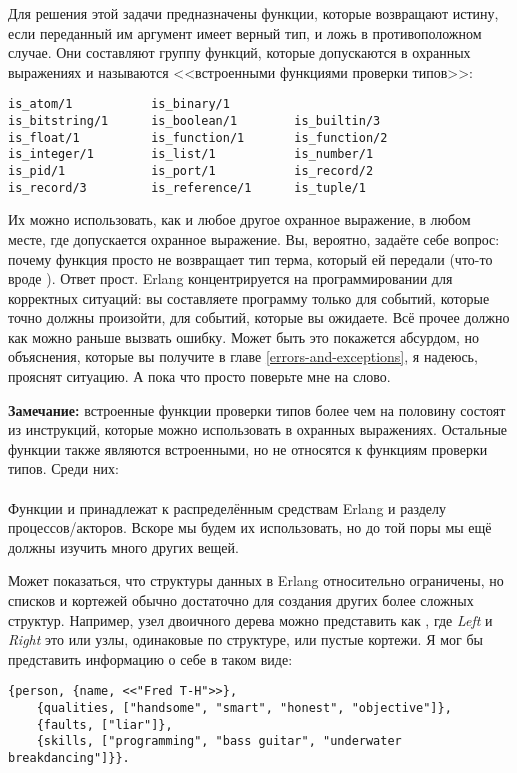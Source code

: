 Для решения этой задачи предназначены функции, которые возвращают истину, если переданный им аргумент имеет верный тип, и ложь в противоположном случае.
Они составляют группу функций, которые допускаются в охранных выражениях и называются <<встроенными функциями проверки типов>>:
\begin{lstlisting}[style=erlang]
is_atom/1           is_binary/1        
is_bitstring/1      is_boolean/1        is_builtin/3       
is_float/1          is_function/1       is_function/2      
is_integer/1        is_list/1           is_number/1        
is_pid/1            is_port/1           is_record/2        
is_record/3         is_reference/1      is_tuple/1        
\end{lstlisting}

Их можно использовать, как и любое другое охранное выражение, в любом месте, где допускается охранное выражение.
Вы, вероятно, задаёте себе вопрос: почему функция просто не возвращает тип терма, который ей передали (что\--то вроде ).
Ответ прост.
Erlang концентрируется на программировании для корректных ситуаций: вы составляете программу только для событий, которые точно должны произойти, для событий, которые вы ожидаете.
Всё прочее должно как можно раньше вызвать ошибку.
Может быть это покажется абсурдом, но объяснения, которые вы получите в главе \ref{errors-and-exceptions}, я надеюсь, прояснят ситуацию.
А пока что просто поверьте мне на слово.\\
\colorbox{lgray}
{
    \begin{minipage}{\linewidth}
\textbf{Замечание:} встроенные функции проверки типов более чем на половину состоят из инструкций, которые можно использовать в охранных выражениях.
Остальные функции также являются встроенными, но не относятся к функциям проверки типов.
Среди них:\\
\\
Функции  и  принадлежат к распределённым средствам Erlang и разделу процессов/акторов.
Вскоре мы будем их использовать, но до той поры мы ещё должны изучить много других вещей.
    \end{minipage}
}

Может показаться, что структуры данных в Erlang относительно ограничены, но списков и кортежей обычно достаточно для создания других более сложных структур.
Например, узел двоичного дерева можно представить как , где \emph{Left} и \emph{Right} это или узлы, одинаковые по структуре, или пустые кортежи.
Я мог бы представить информацию о себе в таком виде:
\begin{lstlisting}[style=erlang]
{person, {name, <<"Fred T-H">>},
    {qualities, ["handsome", "smart", "honest", "objective"]},
    {faults, ["liar"]},
    {skills, ["programming", "bass guitar", "underwater breakdancing"]}}.
\end{lstlisting}

